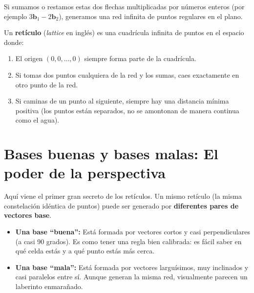 Si sumamos o restamos estas dos flechas multiplicadas por números enteros (por ejemplo $3\mathbf{b}_1 - 2\mathbf{b}_2$), generamos una red infinita de puntos regulares en el plano.

\begin{intuicion}
Un \textbf{retículo} (\textit{lattice} en inglés) es una cuadrícula infinita de puntos en el espacio donde:
\begin{enumerate}
  \item El origen $(0,0,\dots,0)$ siempre forma parte de la cuadrícula.
  \item Si tomas dos puntos cualquiera de la red y los sumas, caes exactamente en otro punto de la red.
  \item Si caminas de un punto al siguiente, siempre hay una distancia mínima positiva (los puntos están separados, no se amontonan de manera continua como el agua).
\end{enumerate}
\end{intuicion}

\section{Bases buenas y bases malas: El poder de la perspectiva}

Aquí viene el primer gran secreto de los retículos. Un mismo retículo (la misma constelación idéntica de puntos) puede ser generado por \textbf{diferentes pares de vectores base}.

\begin{itemize}
  \item \textbf{Una base ``buena'':} Está formada por vectores cortos y casi perpendiculares (a casi 90 grados). Es como tener una regla bien calibrada: es fácil saber en qué celda estás y a qué punto estás más cerca.
  \item \textbf{Una base ``mala'':} Está formada por vectores larguísimos, muy inclinados y casi paralelos entre sí. Aunque generan la misma red, visualmente parecen un laberinto enmarañado.
\end{itemize}

